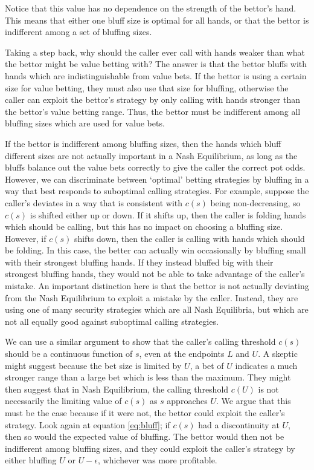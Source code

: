\documentclass[../../main/main.tex]{subfiles}
\begin{document}
Notice that this value has no dependence on the strength of the bettor's hand. This means that either one bluff size is optimal for all hands, or that the bettor is indifferent among a set of bluffing sizes. 

Taking a step back, why should the caller ever call with hands weaker than what the bettor might be value betting with? The answer is that the bettor bluffs with hands which are indistinguishable from value bets. If the bettor is using a certain size for value betting, they must also use that size for bluffing, otherwise the caller can exploit the bettor's strategy by only calling with hands stronger than the bettor's value betting range. Thus, the bettor must be indifferent among all bluffing sizes which are used for value bets.

If the bettor is indifferent among bluffing sizes, then the hands which bluff different sizes are not actually important in a Nash Equilibrium, as long as the bluffs balance out the value bets correctly to give the caller the correct pot odds. However, we can discriminate between `optimal' betting strategies by bluffing in a way that best responds to suboptimal calling strategies. For example, suppose the caller's deviates in a way that is consistent with $c(s)$ being non-decreasing, so $c(s)$ is shifted either up or down. If it shifts up, then the caller is folding hands which should be calling, but this has no impact on choosing a bluffing size. However, if $c(s)$ shifts down, then the caller is calling with hands which should be folding. In this case, the better can actually win occasionally by bluffing small with their strongest bluffing hands. If they instead bluffed big with their strongest bluffing hands, they would not be able to take advantage of the caller's mistake. An important distinction here is that the bettor is not actually deviating from the Nash Equilibrium to exploit a mistake by the caller. Instead, they are using one of many security strategies which are all Nash Equilibria, but which are not all equally good against suboptimal calling strategies. 

We can use a similar argument to show that the caller's calling threshold $c(s)$ should be a continuous function of $s$, even at the endpoints $L$ and $U$. A skeptic might suggest because the bet size is limited by $U$, a bet of $U$ indicates a much stronger range than a large bet which is less than the maximum. They might then suggest that in Nash Equilibrium, the calling threshold $c(U)$ is not necessarily the limiting value of $c(s)$ as $s$ approaches $U$. We argue that this must be the case because if it were not, the bettor could exploit the caller's strategy. Look again at equation \ref{eq:bluff}; if $c(s)$ had a discontinuity at $U$, then so would the expected value of bluffing. The bettor would then not be indifferent among bluffing sizes, and they could exploit the caller's strategy by either bluffing $U$ or $U-\epsilon$, whichever was more profitable.\\
\end{document}

